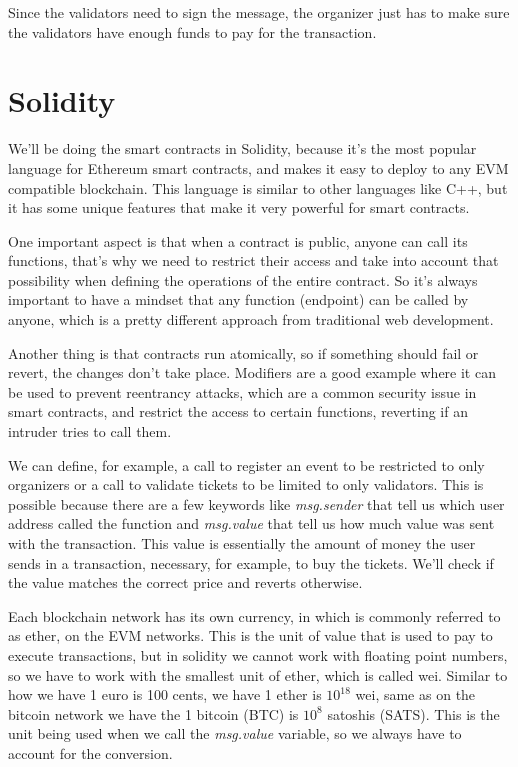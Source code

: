 Since the validators need to sign the message, the organizer just has to make
sure the validators have enough funds to pay for the transaction.

% 
% 

\section{Solidity}
\label{sec:solidity}

We'll be doing the smart contracts in Solidity, because it's the most popular
language for Ethereum smart contracts, and makes it easy to deploy to any EVM
compatible blockchain. This language is similar to other languages like C++,
but it has some unique features that make it very powerful for smart contracts.

One important aspect is that when a contract is public, anyone can call its
functions, that's why we need to restrict their access and take into account
that possibility when defining the operations of the entire contract. So it's
always important to have a mindset that any function (endpoint) can be called
by anyone, which is a pretty different approach from traditional web
development.

Another thing is that contracts run atomically, so if something should fail or
revert, the changes don't take place. Modifiers are a good example where it can
be used to prevent reentrancy attacks, which are a common security issue in
smart contracts, and restrict the access to certain functions, reverting if an
intruder tries to call them.

We can define, for example, a call to register an event to be restricted to
only organizers or a call to validate tickets to be limited to only validators.
This is possible because there are a few keywords like \textit{msg.sender} that
tell us which user address called the function and \textit{msg.value} that tell
us how much value was sent with the transaction. This value is essentially the
amount of money the user sends in a transaction, necessary, for example, to buy
the tickets. We'll check if the value matches the correct price and reverts
otherwise.

Each blockchain network has its own currency, in which is commonly referred to
as ether, on the EVM networks. This is the unit of value that is used to pay to
execute transactions, but in solidity we cannot work with floating point
numbers, so we have to work with the smallest unit of ether, which is called
wei. Similar to how we have 1 euro is 100 cents, we have 1 ether is $10^{18}$
wei, same as on the bitcoin network we have the 1 bitcoin (BTC) is $10^{8}$
satoshis (SATS). This is the unit being used when we call the
\textit{msg.value} variable, so we always have to account for the conversion.

